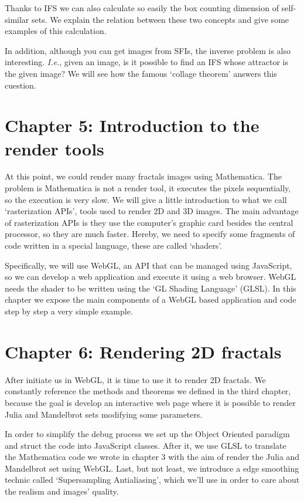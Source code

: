 Thanks to IFS we can also calculate so easily the box counting dimension of self-similar sets. We explain the relation between these two concepts and give some examples of this calculation.

In addition, although you can get images from SFIs, the inverse problem is also interesting. \textit{I.e.}, given an image, is it possible to find an IFS whose attractor is the given image? We will see how the famous `collage theorem' answers this cuestion.

\section*{Chapter 5: Introduction to the render tools}

At this point, we could render many fractals images using Mathematica. The problem is Mathematica is not a render tool, it executes the pixels sequentially, so the execution is very slow. We will give a little introduction to what we call `rasterization APIs', tools used to render 2D and 3D images. The main advantage of rasterization APIs is they use the computer's graphic card besides the central processor, so they are much faster. Hereby, we need to specify some fragments of code written in a special language, these are called `shaders'. 

Specifically, we will use WebGL, an API that can be managed using JavaScript, so we can develop a web application and execute it using a web browser. WebGL needs the shader to be written using the `GL Shading Language' (GLSL). In this chapter we expose the main components of a WebGL based application and code step by step a very simple example.

\section*{Chapter 6: Rendering 2D fractals}

After initiate us in WebGL, it is time to use it to render 2D fractals. We constantly reference the methods and theorems we defined in the third chapter, because the goal is develop an interactive web page where it is possible to render Julia and Mandelbrot sets modifying some parameters.

In order to simplify the debug process we set up the Object Oriented paradigm and struct the code into JavaScript classes. After it, we use GLSL to translate the Mathematica code we wrote in chapter 3 with the aim of render the Julia and Mandelbrot set using WebGL. Last, but not least, we introduce a edge smoothing technic called `Supersampling Antialiasing', which we'll use in order to care about the realism and images' quality.

